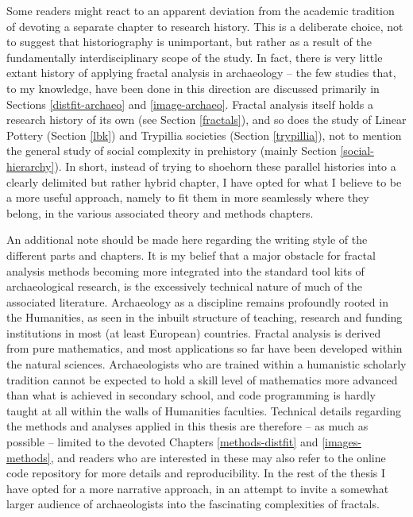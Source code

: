 \documentclass[
  12pt,
  a4paper, twoside]{book}
\begin{document}
Some readers might react to an apparent deviation from the academic tradition of devoting a separate chapter to research history. This is a deliberate choice, not to suggest that historiography is unimportant, but rather as a result of the fundamentally interdisciplinary scope of the study. In fact, there is very little extant history of applying fractal analysis in archaeology -- the few studies that, to my knowledge, have been done in this direction are discussed primarily in Sections \ref{distfit-archaeo} and \ref{image-archaeo}. Fractal analysis itself holds a research history of its own (see Section \ref{fractals}), and so does the study of Linear Pottery (Section \ref{lbk}) and Trypillia societies (Section \ref{trypillia}), not to mention the general study of social complexity in prehistory (mainly Section \ref{social-hierarchy}). In short, instead of trying to shoehorn these parallel histories into a clearly delimited but rather hybrid chapter, I have opted for what I believe to be a more useful approach, namely to fit them in more seamlessly where they belong, in the various associated theory and methods chapters.

An additional note should be made here regarding the writing style of the different parts and chapters. It is my belief that a major obstacle for fractal analysis methods becoming more integrated into the standard tool kits of archaeological research, is the excessively technical nature of much of the associated literature. Archaeology as a discipline remains profoundly rooted in the Humanities, as seen in the inbuilt structure of teaching, research and funding institutions in most (at least European) countries. Fractal analysis is derived from pure mathematics, and most applications so far have been developed within the natural sciences. Archaeologists who are trained within a humanistic scholarly tradition cannot be expected to hold a skill level of mathematics more advanced than what is achieved in secondary school, and code programming is hardly taught at all within the walls of Humanities faculties. Technical details regarding the methods and analyses applied in this thesis are therefore -- as much as possible -- limited to the devoted Chapters \ref{methods-distfit} and \ref{images-methods}, and readers who are interested in these may also refer to the online code repository for more details and reproducibility. In the rest of the thesis I have opted for a more narrative approach, in an attempt to invite a somewhat larger audience of archaeologists into the fascinating complexities of fractals.
\end{document}

